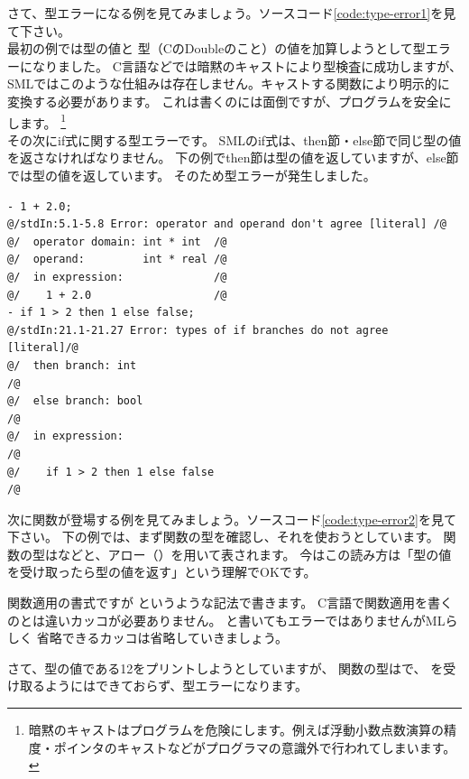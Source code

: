 \documentclass[11pt,a4paper]{jarticle}
\begin{document}
さて、型エラーになる例を見てみましょう。ソースコード\ref{code:type-error1}を見て下さい。\\
最初の例では型の値と
型（CのDoubleのこと）の値を加算しようとして型エラーになりました。
C言語などでは暗黙のキャストにより型検査に成功しますが、
SMLではこのような仕組みは存在しません。キャストする関数により明示的に変換する必要があります。
これは書くのには面倒ですが、プログラムを安全にします。
\footnote{暗黙のキャストはプログラムを危険にします。例えば浮動小数点数演算の精度・ポインタのキャストなどがプログラマの意識外で行われてしまいます。}\\
その次にif式に関する型エラーです。
SMLのif式は、then節・else節で同じ型の値を返さなければなりません。
下の例でthen節は型の値を返していますが、else節では型の値を返しています。
そのため型エラーが発生しました。

\begin{lstlisting}[label=code:type-error1,caption=型エラー１]
- 1 + 2.0;
@/stdIn:5.1-5.8 Error: operator and operand don't agree [literal] /@
@/  operator domain: int * int  /@
@/  operand:         int * real /@
@/  in expression:              /@
@/    1 + 2.0                   /@
- if 1 > 2 then 1 else false;
@/stdIn:21.1-21.27 Error: types of if branches do not agree [literal]/@
@/  then branch: int                                                 /@
@/  else branch: bool                                                /@
@/  in expression:                                                   /@
@/    if 1 > 2 then 1 else false                                     /@
\end{lstlisting}

次に関数が登場する例を見てみましょう。ソースコード\ref{code:type-error2}を見て下さい。
下の例では、まず関数の型を確認し、それを使おうとしています。
関数の型はなどと、アロー（\prog{->}）を用いて表されます。
今はこの読み方は「型の値を受け取ったら型の値を返す」という理解でOKです。

関数適用の書式ですが  というような記法で書きます。
C言語で関数適用を書くのとは違いカッコが必要ありません。
と書いてもエラーではありませんがMLらしく
省略できるカッコは省略していきましょう。

さて、型の値である12をプリントしようとしていますが、
関数の型はで、
を受け取るようにはできておらず、型エラーになります。
\end{document}
